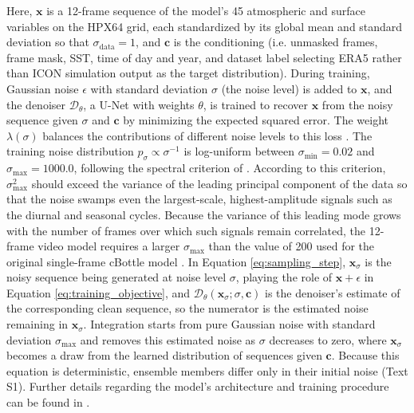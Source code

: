 \documentclass[final]{agujournal2019}
\begin{document}
Here, $\mathbf{x}$ is a 12-frame sequence of the model's 45 atmospheric and surface variables on the HPX64 grid, each standardized by its global mean and standard deviation so that $\sigma_{\text{data}} = 1$, and $\mathbf{c}$ is the conditioning (i.e. unmasked frames, frame mask, SST, time of day and year, and dataset label selecting ERA5 rather than ICON simulation output as the target distribution). During training, Gaussian noise $\epsilon$ with standard deviation $\sigma$ (the noise level) is added to $\mathbf{x}$, and the denoiser $\mathcal{D}_\theta$, a U-Net with weights $\theta$, is trained to recover $\mathbf{x}$ from the noisy sequence given $\sigma$ and $\mathbf{c}$ by minimizing the expected squared error. The weight $\lambda(\sigma)$ balances the contributions of different noise levels to this loss \cite{Karras2022-xq}. The training noise distribution $p_\sigma \propto \sigma^{-1}$ is log-uniform between $\sigma_{\min} = 0.02$ and $\sigma_{\max} = 1000.0$, following the spectral criterion of . According to this criterion, $\sigma_{\max}^2$ should exceed the variance of the leading principal component of the data so that the noise swamps even the largest-scale, highest-amplitude signals such as the diurnal and seasonal cycles. Because the variance of this leading mode grows with the number of frames over which such signals remain correlated, the 12-frame video model requires a larger $\sigma_{\max}$ than the value of 200 used for the original single-frame cBottle model \cite[Section A.8.2]{Brenowitz2025-mz}. In Equation \ref{eq:sampling_step}, $\mathbf{x}_\sigma$ is the noisy sequence being generated at noise level $\sigma$, playing the role of $\mathbf{x} + \epsilon$ in Equation \ref{eq:training_objective}, and $\mathcal{D}_\theta(\mathbf{x}_\sigma; \sigma, \mathbf{c})$ is the denoiser's estimate of the corresponding clean sequence, so the numerator is the estimated noise remaining in $\mathbf{x}_\sigma$. Integration starts from pure Gaussian noise with standard deviation $\sigma_{\max}$ and removes this estimated noise as $\sigma$ decreases to zero, where $\mathbf{x}_\sigma$ becomes a draw from the learned distribution of sequences given $\mathbf{c}$. Because this equation is deterministic, ensemble members differ only in their initial noise (Text S1). Further details regarding the model's architecture and training procedure can be found in .
\end{document}
